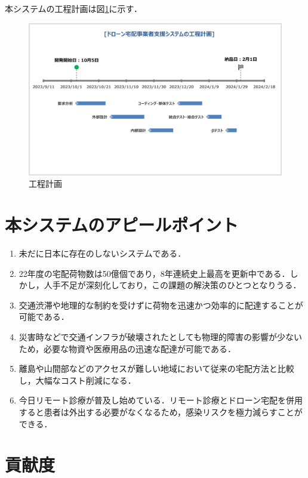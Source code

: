 \documentclass[a4paper, titlepage]{jsarticle}
\begin{document}
本システムの工程計画は図\ref{schedule}に示す．
\begin{figure}[htbp]
        \label{schedule}
        \centering
        \includegraphics[width=15cm]{schedule.png}
        \caption{工程計画}
\end{figure}

\section{本システムのアピールポイント}
\begin{enumerate}
        \item 未だに日本に存在のしないシステムである．
        \item 22年度の宅配荷物数は50億個であり，8年連続史上最高を更新中である．しかし，人手不足が深刻化しており，この課題の解決策のひとつとなりうる．
        \item 交通渋滞や地理的な制約を受けずに荷物を迅速かつ効率的に配達することが可能である．
        \item 災害時などで交通インフラが破壊されたとしても物理的障害の影響が少ないため，必要な物資や医療用品の迅速な配達が可能である．
        \item 離島や山間部などのアクセスが難しい地域において従来の宅配方法と比較し，大幅なコスト削減になる．
        \item 今日リモート診療が普及し始めている．リモート診療とドローン宅配を併用すると患者は外出する必要がなくなるため，感染リスクを極力減らすことができる．
\end{enumerate}

\section{貢献度}
\end{document}
